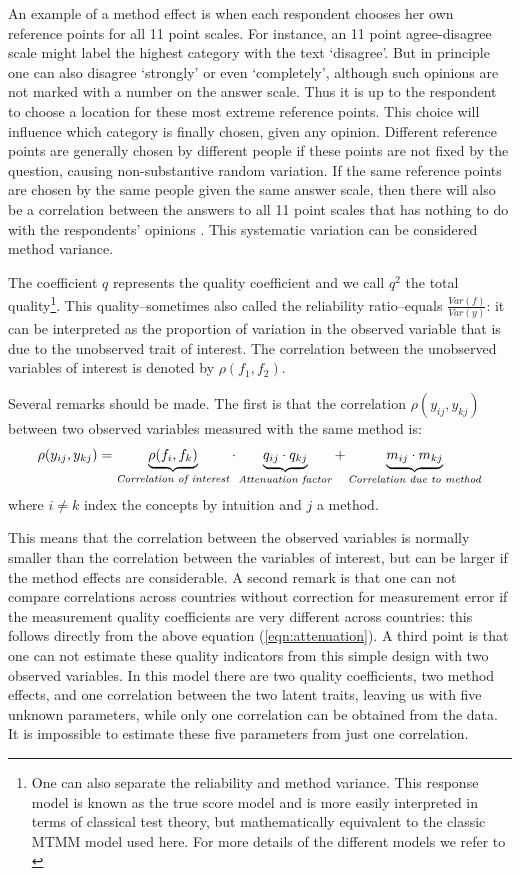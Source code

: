 \documentclass[a4paper,12pt]{article}
\begin{document}
An example of a method effect is when each respondent chooses her own reference points for all 11 point scales.
For instance, an 11 point agree-disagree scale might label the highest category with the text `disagree'. But in principle one can also disagree `strongly' or even `completely', although such opinions are not marked with a number on the answer scale. Thus it is up to the respondent to choose a location for these most extreme reference points. This choice will influence which category is finally chosen, given any opinion.  Different reference points are generally chosen by different people if these points are not fixed by the question, causing non-substantive random variation. If the same reference points are chosen by the same people given the same answer scale, then there will also be a correlation between the answers to all 11 point scales that has nothing to do with the respondents' opinions \citep{saris_variation_1988}. This systematic variation can be considered method variance.

The coefficient $q$ represents the quality coefficient and we call $q^2$ the total quality\footnote{One can also separate the reliability and method variance. This response model is known as the true score model and is more easily interpreted in terms of classical test theory, but mathematically equivalent to the classic MTMM model used here. For more details of the different models we refer to \citep{saris_evaluation_1991}}.
This quality--sometimes also called the reliability ratio--equals $\frac{Var(f)}{Var(y)}$: it can be interpreted as the proportion of variation in the observed variable that is due to the unobserved trait of interest. The correlation between the unobserved variables of interest is denoted by $\rho(f_1,f_2)$.

Several remarks should be made. The first is that the correlation $\rho(y_{ij}, y_{kj})$ between two observed variables measured with the same method is:
\begin{equation}
\rho(y_{ij}, y_{kj}) = \underbrace{\rho(f_i, f_k)}_{\textrm{\emph{Correlation of interest}}} \cdot \underbrace{q_{ij} \cdot q_{kj}}_{\textrm{\emph{Attenuation factor}}} + \underbrace{m_{ij} \cdot m_{kj}}_{\textrm{\emph{Correlation due to method}}}
\label{eqn:attenuation}\end{equation}
where $i \neq k$ index the concepts by intuition and $j$ a method.

This means that the correlation between the observed variables is normally smaller than the correlation between the variables of interest, but can be larger if the method effects are considerable. A second remark is that one can not compare correlations across countries without correction for measurement error if the measurement quality coefficients are very different across countries: this follows directly from the above equation (\ref{eqn:attenuation}). A third point is that one can not estimate these quality indicators from this simple design with two observed variables. In this model there are two quality coefficients, two method effects, and one correlation between the two latent traits, leaving us with  five unknown parameters, while only one correlation can be obtained from the data. It is impossible to estimate these five parameters from just one correlation.  
\end{document}
